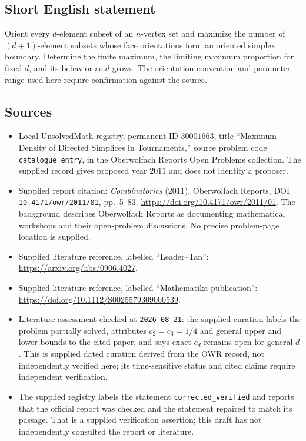 \documentclass[11pt]{article}
\begin{document}
\subsection{Short English statement}
Orient every \(d\)-element subset of an \(n\)-vertex set and maximize the number of \((d+1)\)-element subsets whose face orientations form an oriented simplex boundary. Determine the finite maximum, the limiting maximum proportion for fixed \(d\), and its behavior as \(d\) grows. The orientation convention and parameter range used here require confirmation against the source.
\subsection{Sources}
\begin{itemize}
\item Local UnsolvedMath registry, permanent ID \(30001663\), title ``Maximum Density of Directed Simplices in Tournaments,'' source problem code \texttt{catalogue entry}, in the Oberwolfach Reports Open Problems collection. The supplied record gives proposed year \(2011\) and does not identify a proposer.
\item Supplied report citation: \emph{Combinatorics} (2011), Oberwolfach Reports, DOI \texttt{10.4171/owr/2011/01}, pp.\ 5--83. \url{https://doi.org/10.4171/owr/2011/01}. The background describes Oberwolfach Reports as documenting mathematical workshops and their open-problem discussions. No precise problem-page location is supplied.
\item Supplied literature reference, labelled ``Leader--Tan'': \url{https://arxiv.org/abs/0906.4027}.
\item Supplied literature reference, labelled ``Mathematika publication'': \url{https://doi.org/10.1112/S0025579309000539}.
\item Literature assessment checked at \texttt{2026-08-21}: the supplied curation labels the problem partially solved, attributes \(c_2=c_3=1/4\) and general upper and lower bounds to the cited paper, and says exact \(c_d\) remains open for general \(d\). This is supplied dated curation derived from the OWR record, not independently verified here; its time-sensitive status and cited claims require independent verification.
\item The supplied registry labels the statement \texttt{corrected\_verified} and reports that the official report was checked and the statement repaired to match its passage. That is a supplied verification assertion; this draft has not independently consulted the report or literature.
\end{itemize}
\end{document}
